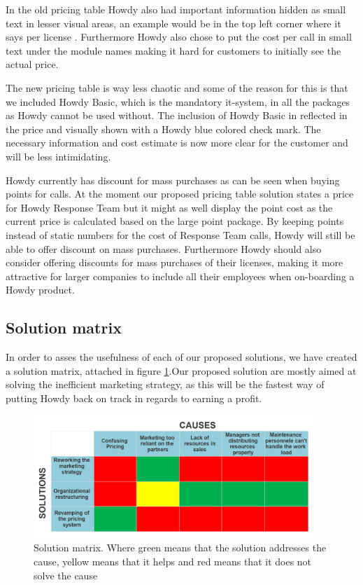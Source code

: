 \noindent In the old pricing table Howdy also had important information hidden as small text in lesser visual areas, an example would be in the top left corner where it says per license \cite[p.30]{oneofthepresentations}. Furthermore Howdy also chose to put the cost per call in small text under the module names making it hard for customers to initially see the actual price. 

\noindent The new pricing table is way less chaotic and some of the reason for this is that we included Howdy Basic, which is the mandatory it-system, in all the packages as Howdy cannot be used without. The inclusion of Howdy Basic in reflected in the price and visually shown with a Howdy blue colored check mark. The necessary information and cost estimate is now more clear for the customer and will be less intimidating.


\noindent Howdy currently has discount for mass purchases as can be seen when buying points for calls. At the moment our proposed pricing table solution states a price for Howdy Response Team but it might as well display the point cost as the current price is calculated based on the large point package. By keeping points instead of static numbers for the cost of Response Team calls, Howdy will still be able to offer discount on mass purchases. Furthermore Howdy should also consider offering discounts for mass purchases of their licenses, making it more attractive for larger companies to include all their employees when on-boarding a Howdy product. 

\subsection{Solution matrix}

In order to asses the usefulness of each of our proposed solutions, we have created a solution matrix, attached in figure \ref{fig:solution}.Our proposed solution are mostly aimed at solving the inefficient marketing strategy, as this will be the fastest way of putting Howdy back on track in regards to earning a profit.

\begin{figure}[H]
\centering
\includegraphics[width=0.95\textwidth]{figures/solutionmatrix .png}
\caption{Solution matrix. Where green means that the solution addresses the cause, yellow means that it helps and red means that it does not solve the cause}
\label{fig:solution}
\end{figure}
